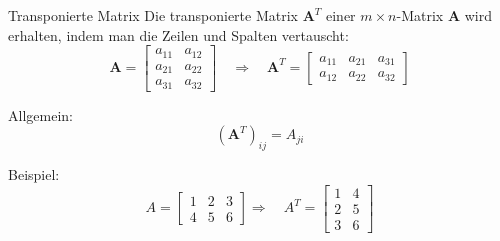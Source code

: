 \documentclass{beamer}
\begin{document}
\begin{frame}{Transponierte Matrix}
  Die transponierte Matrix \(\mathbf{A}^T\) einer \(m \times n\)-Matrix \(\mathbf{A}\) wird erhalten, indem man die Zeilen und Spalten vertauscht:
  \[
    \mathbf{A} = \begin{bmatrix} a_{11} & a_{12} \\ a_{21} & a_{22} \\ a_{31} & a_{32} \end{bmatrix} \quad
    \Rightarrow \quad
    \mathbf{A}^T = \begin{bmatrix} a_{11} & a_{21} & a_{31} \\ a_{12} & a_{22} & a_{32} \end{bmatrix}
  \]
  
  Allgemein:
  \[
    (\mathbf{A}^T)_{ij} = A_{ji}
  \]

  Beispiel:
  \[A= \begin{bmatrix}
    1 & 2 & 3\\
    4 & 5 & 6
  \end{bmatrix}
  \Rightarrow \quad
  A^T = \begin{bmatrix}
    1 & 4\\
    2 & 5\\
    3 & 6
  \end{bmatrix}
    \]
\end{frame}
\end{document}
